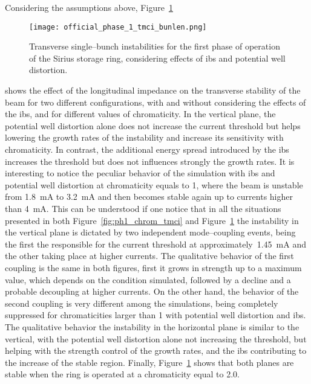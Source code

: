     Considering the assumptions above, Figure~\ref{fig:ph1_chrom_tmci_bunlen}
    \begin{figure}
        \centering
        \texttt{[image: official\_phase\_1\_tmci\_bunlen.png]}
        \caption{Transverse single--bunch instabilities for the first phase of operation of the Sirius storage ring, considering effects of \gls{ibs} and potential well distortion.}
        \label{fig:ph1_chrom_tmci_bunlen}
    \end{figure}
    shows the effect of the longitudinal impedance on the transverse stability of the beam for two different configurations, with and without considering the effects of the \gls{ibs}, and for different values of chromaticity. In the vertical plane, the potential well distortion alone does not increase the current threshold but helps lowering the growth rates of the instability and increase its sensitivity with chromaticity. In contrast, the additional energy spread introduced by the \gls{ibs} increases the threshold but does not influences strongly the growth rates. It is interesting to notice the peculiar behavior of the simulation with \gls{ibs} and potential well distortion at chromaticity equals to \num{1}, where the beam is unstable from \SI{1.8}{\milli\ampere} to \SI{3.2}{\milli\ampere} and then becomes stable again up to currents higher than \SI{4}{\milli\ampere}.
    This can be understood if one notice that in all the situations presented in both Figure~\ref{fig:ph1_chrom_tmci} and Figure~\ref{fig:ph1_chrom_tmci_bunlen} the instability in the vertical plane is dictated by two independent mode--coupling events, being the first the responsible for the current threshold at approximately~\SI{1.45}{\milli\ampere} and the other taking place at higher currents. The qualitative behavior of the first coupling is the same in both figures, first it grows in strength up to a maximum value, which depends on the condition simulated, followed by a decline and a probable decoupling at higher currents. On the other hand, the behavior of the second coupling is very different among the simulations, being completely suppressed for chromaticities larger than \num{1} with potential well distortion and \gls{ibs}. The qualitative behavior the instability in the horizontal plane is similar to the vertical, with the potential well distortion alone not increasing the threshold, but helping with the strength control of the growth rates, and the \gls{ibs} contributing to the increase of the stable region.
    Finally, Figure~\ref{fig:ph1_chrom_tmci_bunlen} shows that both planes are stable when the ring is operated at a chromaticity equal to \num{2.0}.


